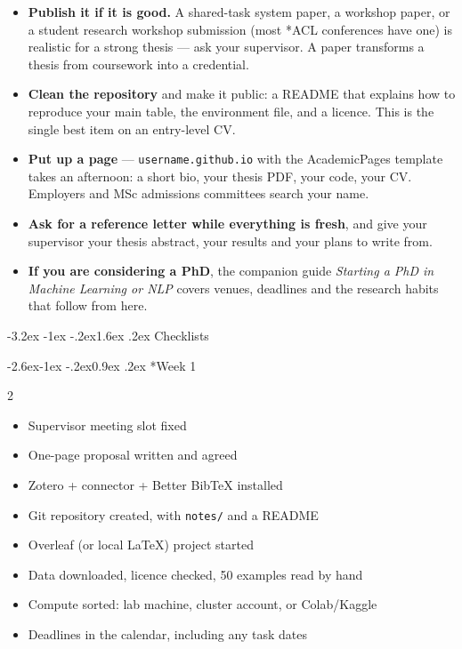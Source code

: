 \documentclass[11pt,a4paper]{article}
\makeatletter
\renewcommand\section{\@startsection{section}{1}{\z@}%
  {-3.2ex \@plus -1ex \@minus -.2ex}{1.6ex \@plus.2ex}%
  {\normalfont\Large\bfseries\color{brand}}}
\renewcommand\subsection{\@startsection{subsection}{2}{\z@}%
  {-2.6ex\@plus -1ex \@minus -.2ex}{0.9ex \@plus .2ex}%
  {\normalfont\large\bfseries\color{brandlight}}}
\newcommand{\code}[1]{\texttt{\small #1}}
\makeatother
\begin{document}
\begin{itemize}
  \item \textbf{Publish it if it is good.} A shared-task system paper, a
        workshop paper, or a student research workshop submission (most *ACL
        conferences have one) is realistic for a strong thesis --- ask your
        supervisor. A paper transforms a thesis from coursework into a
        credential.
  \item \textbf{Clean the repository} and make it public: a README that
        explains how to reproduce your main table, the environment file, and
        a licence. This is the single best item on an entry-level CV.
  \item \textbf{Put up a page} --- \code{username.github.io} with the
        AcademicPages template takes an afternoon: a short bio, your thesis
        PDF, your code, your CV. Employers and MSc admissions committees
        search your name.
  \item \textbf{Ask for a reference letter while everything is fresh}, and
        give your supervisor your thesis abstract, your results and your plans
        to write from.
  \item \textbf{If you are considering a PhD}, the companion guide
        \emph{Starting a PhD in Machine Learning or NLP} covers venues,
        deadlines and the research habits that follow from here.
\end{itemize}

\section{Checklists}

\subsection*{Week 1}
\begin{multicols}{2}
\begin{itemize}
  \item Supervisor meeting slot fixed
  \item One-page proposal written and agreed
  \item Zotero + connector + Better BibTeX installed
  \item Git repository created, with \code{notes/} and a README
  \item Overleaf (or local LaTeX) project started
  \item Data downloaded, licence checked, 50 examples read by hand
  \item Compute sorted: lab machine, cluster account, or Colab/Kaggle
  \item Deadlines in the calendar, including any task dates
\end{itemize}
\end{multicols}
\end{document}
